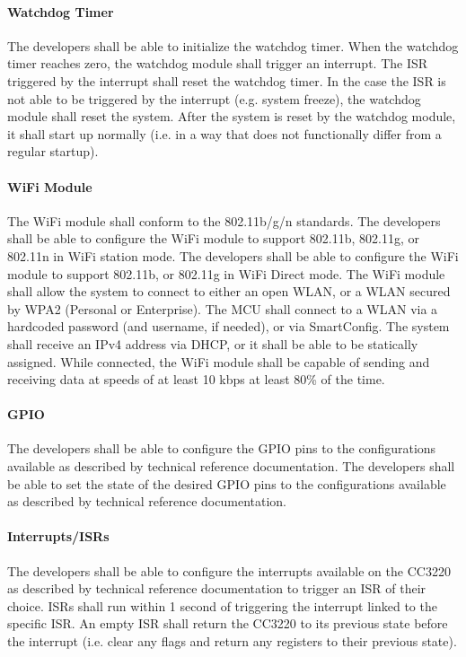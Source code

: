 \paragraph{Watchdog Timer} The developers shall be able to initialize the
watchdog timer. When the watchdog timer reaches zero, the watchdog module
shall trigger an interrupt. The ISR triggered by the interrupt shall
reset the watchdog timer. In the case the ISR is not able to be triggered by
the interrupt (e.g. system freeze), the watchdog module shall reset the system.
After the system is reset by the watchdog module, it shall start up normally
(i.e. in a way that does not functionally differ from a regular startup).

\paragraph{WiFi Module} The WiFi module shall conform to the 802.11b/g/n
standards. The developers shall be able to configure the WiFi
module to support 802.11b, 802.11g, or 802.11n in WiFi station mode.  The 
developers shall be able to configure the WiFi module to support 802.11b, or
802.11g in WiFi Direct mode. The WiFi module shall allow the system to
connect to either an open WLAN, or a WLAN secured by WPA2 (Personal or
Enterprise). The MCU shall connect to a WLAN via a hardcoded password (and
username, if needed), or via SmartConfig. The system shall receive an IPv4
address via DHCP, or it shall be able to be statically assigned. While
connected, the WiFi module shall be capable of sending and receiving
data at speeds of at least 10 kbps at least 80\% of the time.

\paragraph{GPIO} The developers shall be able to configure the GPIO pins to
the configurations available as described by technical reference documentation.
The developers shall be able to set the state of the desired GPIO pins to
the configurations available as described by technical reference documentation.

\paragraph{Interrupts/ISRs} The developers shall be able to configure
the interrupts available on the CC3220 as described by technical reference
documentation to trigger an ISR of their choice. ISRs shall run within 1 second
of triggering the interrupt linked to the specific ISR. An empty ISR shall
return the CC3220 to its previous state before the interrupt (i.e. clear any
flags and return any registers to their previous state).

